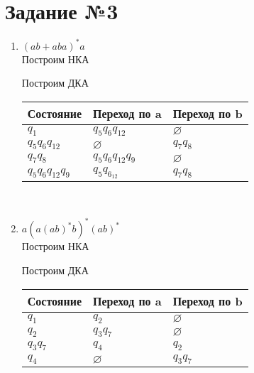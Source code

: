 \documentclass{article}
\begin{document}
\section*{\huge{Задание №3}} 

    \begin{enumerate}
        \LARGE
        
        
        \item $ (ab + aba)^*a$ \\
            Построим НКА \\
            
            \begin{center}
            \end{center}
            
            Построим ДКА
            
            \begin{tabular} { | l | l | l | }
                \hline 
                Состояние & Переход по a & Переход по b \\ \hline
                $q_1$ & $q_5q_6q_{12}$ & $\varnothing$ \\ \hline
                $q_5q_6q_{12}$ & $\varnothing$ & $q_7q_8$ \\ \hline
                $q_7q_8$ & $q_5q_6q_{12}q_9$ & $\varnothing$ \\ \hline
                $q_5q_6q_{12}q_9$ & $q_5q_6_{12}$ & $q_7q_8$ \\ \hline                
                
                \hline
            \end{tabular} \\          
            
            \begin{center}
            \end{center}    
        
        \item $a(a(ab)^*b)^*(ab)^*$ \\
            Построим НКА
            \begin{center}
            \end{center}
            
            Построим ДКА
            
            \begin{tabular} { | l | l | l | }
                \hline 
                Состояние & Переход по a & Переход по b \\ \hline
                $q_1$ & $q_2$ & $\varnothing$ \\ \hline
                $q_2$ & $q_3q_7$ & $\varnothing$ \\ \hline
                $q_3q_7$ & $q_4$ & $q_2$ \\ \hline
                 $q_4$ & $\varnothing$ & $q_3q_7$ \\
                \hline
            \end{tabular} \\  
            

\end{enumerate}
\end{document}
